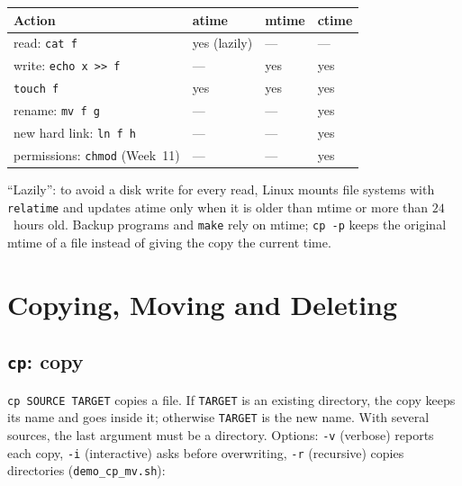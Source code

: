 \documentclass[11pt,a4paper]{article}
\newcommand{\cmd}[1]{\texttt{#1}}
\begin{document}
\begin{center}
\renewcommand{\arraystretch}{1.2}
\begin{tabular}{@{}llll@{}}
\toprule
\textbf{Action} & \textbf{atime} & \textbf{mtime} & \textbf{ctime} \\
\midrule
read: \cmd{cat f} & yes (lazily) & --- & --- \\
write: \cmd{echo x >> f} & --- & yes & yes \\
\cmd{touch f} & yes & yes & yes \\
rename: \cmd{mv f g} & --- & --- & yes \\
new hard link: \cmd{ln f h} & --- & --- & yes \\
permissions: \cmd{chmod} (Week~11) & --- & --- & yes \\
\bottomrule
\end{tabular}
\end{center}

``Lazily'': to avoid a disk write for every read, Linux mounts file systems with \texttt{relatime} and updates atime only when it is older than mtime or more than $24$~hours old. Backup programs and \cmd{make} rely on mtime; \cmd{cp -p} keeps the original mtime of a file instead of giving the copy the current time.

\section{Copying, Moving and Deleting}

\subsection{\texttt{cp}: copy}

\cmd{cp SOURCE TARGET} copies a file. If \texttt{TARGET} is an existing directory, the copy keeps its name and goes inside it; otherwise \texttt{TARGET} is the new name. With several sources, the last argument must be a directory. Options: \cmd{-v} (verbose) reports each copy, \cmd{-i} (interactive) asks before overwriting, \cmd{-r} (recursive) copies directories (\cmd{demo\_cp\_mv.sh}):
\end{document}
